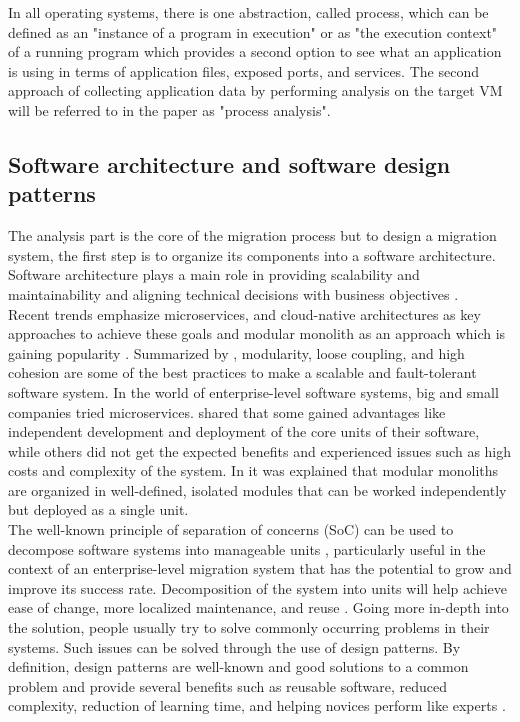 \documentclass[twocolumn]{article}
\begin{document}
In all operating systems, there is one abstraction, called process, which can be defined as an "instance of a program in execution" or as "the execution context" of a running program \cite{BovetEtAl-2005} which provides a second option to see what an application is using in terms of application files, exposed ports, and services. The second approach of collecting application data by performing analysis on the target VM will be referred to in the paper as "process analysis".

\subsection{Software architecture and software design patterns}
The analysis part is the core of the migration process but to design a migration system, the first step is to organize its components into a software architecture. Software architecture plays a main role in providing scalability and maintainability and aligning technical decisions with business objectives \cite{Nivedhaa-2024}. \\

Recent trends emphasize microservices, and cloud-native architectures as key approaches to achieve these goals \cite{Nivedhaa-2024} and modular monolith as an approach which is gaining popularity \cite{SuEtAl-2024}. Summarized by \cite{Nivedhaa-2024}, modularity, loose coupling, and high cohesion are some of the best practices to make a scalable and fault-tolerant software system. In the world of enterprise-level software systems, big and small companies tried microservices. \cite{SuEtAl-2024} shared that some gained advantages like independent development and deployment of the core units of their software, while others did not get the expected benefits and experienced issues such as high costs and complexity of the system. In \cite{SuEtAl-2024} it was explained that modular monoliths are organized in well-defined, isolated modules that can be worked independently but deployed as a single unit. \\

The well-known principle of separation of concerns (SoC) can be used to decompose software systems into manageable units \cite{Daga-2006}, particularly useful in the context of an enterprise-level migration system that has the potential to grow and improve its success rate. Decomposition of the system into units will help achieve ease of change, more localized maintenance, and reuse \cite{Daga-2006}. Going more in-depth into the solution, people usually try to solve commonly occurring problems in their systems. Such issues can be solved through the use of design patterns. By definition, design patterns are well-known and good solutions to a common problem \cite{Martin-2000} and provide several benefits such as reusable software, reduced complexity, reduction of learning time, and helping novices perform like experts \cite{GammaEtAl-1993}. \\
\end{document}
